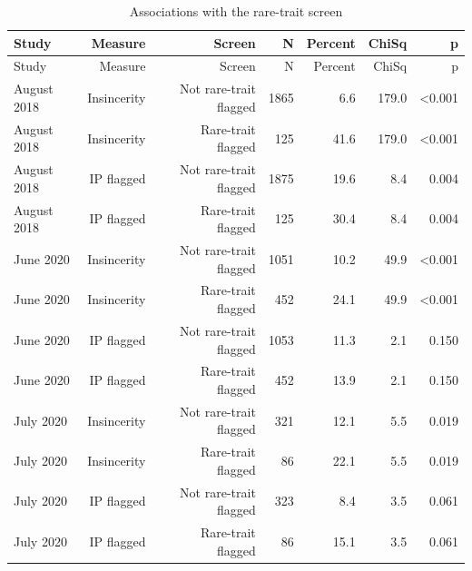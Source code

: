 {\small
\begin{longtable}{lrrrrrr}
\caption{Associations with the rare-trait screen}\\
\toprule
Study & Measure & Screen & N & Percent & ChiSq & p \\
\midrule\endfirsthead
\toprule
Study & Measure & Screen & N & Percent & ChiSq & p \\
\midrule\endhead
\bottomrule\endfoot
August 2018 & Insincerity & Not rare-trait flagged & 1865 & 6.6 & 179.0 & <0.001 \\
August 2018 & Insincerity & Rare-trait flagged & 125 & 41.6 & 179.0 & <0.001 \\
August 2018 & IP flagged & Not rare-trait flagged & 1875 & 19.6 & 8.4 & 0.004 \\
August 2018 & IP flagged & Rare-trait flagged & 125 & 30.4 & 8.4 & 0.004 \\
June 2020 & Insincerity & Not rare-trait flagged & 1051 & 10.2 & 49.9 & <0.001 \\
June 2020 & Insincerity & Rare-trait flagged & 452 & 24.1 & 49.9 & <0.001 \\
June 2020 & IP flagged & Not rare-trait flagged & 1053 & 11.3 & 2.1 & 0.150 \\
June 2020 & IP flagged & Rare-trait flagged & 452 & 13.9 & 2.1 & 0.150 \\
July 2020 & Insincerity & Not rare-trait flagged & 321 & 12.1 & 5.5 & 0.019 \\
July 2020 & Insincerity & Rare-trait flagged & 86 & 22.1 & 5.5 & 0.019 \\
July 2020 & IP flagged & Not rare-trait flagged & 323 & 8.4 & 3.5 & 0.061 \\
July 2020 & IP flagged & Rare-trait flagged & 86 & 15.1 & 3.5 & 0.061 \\
\end{longtable}}
